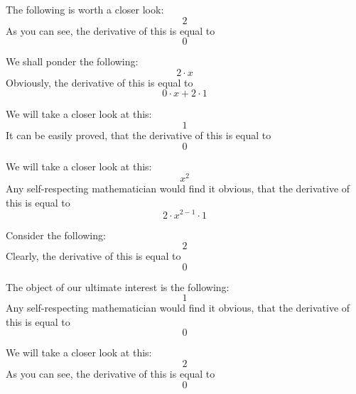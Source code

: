 \documentclass{article}
\begin{document}
The following is worth a closer look:
\begin{equation}
2 
\end{equation}
As you can see, the derivative of this is equal to
\begin{equation}
0 
\end{equation}

We shall ponder the following:
\begin{equation}
2 \cdot x 
\end{equation}
Obviously, the derivative of this is equal to
\begin{equation}
0 \cdot x + 2 \cdot 1 
\end{equation}

We will take a closer look at this:
\begin{equation}
1 
\end{equation}
It can be easily proved, that the derivative of this is equal to
\begin{equation}
0 
\end{equation}

We will take a closer look at this:
\begin{equation}
x ^{2 } 
\end{equation}
Any self-respecting mathematician would find it obvious, that the derivative of this is equal to
\begin{equation}
2 \cdot x ^{2 - 1 } \cdot 1 
\end{equation}

Consider the following:
\begin{equation}
2 
\end{equation}
Clearly, the derivative of this is equal to
\begin{equation}
0 
\end{equation}

The object of our ultimate interest is the following:
\begin{equation}
1 
\end{equation}
Any self-respecting mathematician would find it obvious, that the derivative of this is equal to
\begin{equation}
0 
\end{equation}

We will take a closer look at this:
\begin{equation}
2 
\end{equation}
As you can see, the derivative of this is equal to
\begin{equation}
0 
\end{equation}
\end{document}
